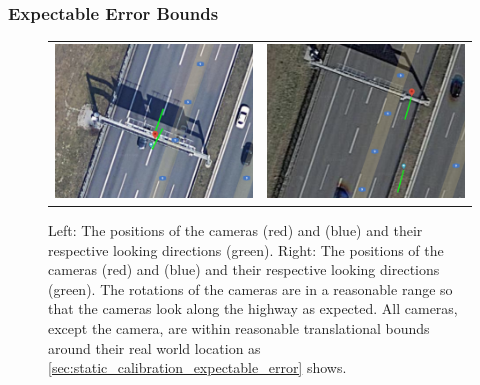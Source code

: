 


\subsubsection{Expectable Error Bounds}

\begin{figure}[t]
  \centering
  \begin{tabular}{cc}
    \includegraphics[width=0.45 \linewidth]{images/calibration/google_maps_s40_n.png} &
    \includegraphics[width=0.45 \linewidth]{images/calibration/google_maps_s50_s.png} 
\end{tabular}
\caption{Left: The positions of the cameras  (red) and  (blue) and their respective looking directions (green). 
Right: The positions of the cameras  (red) and  (blue) and their respective looking directions (green). 
The rotations of the cameras are in a reasonable range so that the cameras look along the highway as expected. 
All cameras, except the  camera, are within reasonable translational bounds around their real world location as \autoref{sec:static_calibration_expectable_error} shows.
}
\label{fig:static_calibration_google_maps}
\end{figure}

